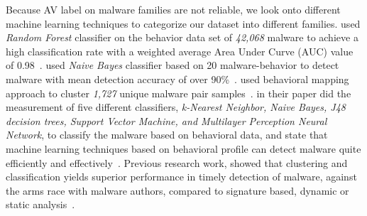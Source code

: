 Because AV label on malware families are not reliable, we look onto different machine learning techniques to categorize our dataset into different families.
\textbf{\citeauthor{pirscoveanu}} used \emph{Random Forest} classifier on the behavior data set of \emph{42,068} malware to achieve a high classification rate with a weighted average Area Under Curve (AUC) value of 0.98~\cite[]{pirscoveanu}.
\textbf{\citeauthor{mosko}} used \emph{Naive Bayes} classifier based on 20 malware-behavior to detect malware with mean detection accuracy of over 90\%~\cite[]{mosko}.
\textbf{\citeauthor{yavvari}} used behavioral mapping approach to cluster \emph{1,727} unique malware pair samples~\cite[]{yavvari}.
\textbf{\citeauthor{firdausi}} in their paper did the measurement of five different classifiers, \emph{k-Nearest Neighbor, Naive Bayes, J48 decision trees, Support Vector Machine, and Multilayer Perception Neural Network}, to classify the malware based on behavioral data, and state that machine learning techniques based on behavioral profile can detect malware quite efficiently and effectively~\cite[]{firdausi}.
Previous research work, showed that clustering and classification yields superior performance in timely detection of malware, against the arms race with malware authors, compared to signature based, dynamic or static analysis~\cite[]{bailey,bayer,rieck2009automatic}.
\\

